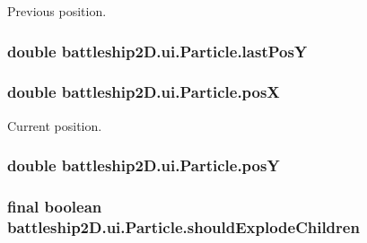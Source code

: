 Previous position. 

\hypertarget{classbattleship2D_1_1ui_1_1Particle_a5a420fd563faed7e5fe9635413dd6b5e}{
\subsubsection[{last\-Pos\-Y}]{\setlength{\rightskip}{0pt plus 5cm}double battleship2\-D.\-ui.\-Particle.\-last\-Pos\-Y\hspace{0.3cm}{\ttfamily [package]}}}\label{classbattleship2D_1_1ui_1_1Particle_a5a420fd563faed7e5fe9635413dd6b5e}
\hypertarget{classbattleship2D_1_1ui_1_1Particle_a43ea7800c7ba89fcc30583e2cc0970e4}{
\subsubsection[{pos\-X}]{\setlength{\rightskip}{0pt plus 5cm}double battleship2\-D.\-ui.\-Particle.\-pos\-X\hspace{0.3cm}{\ttfamily [private]}}}\label{classbattleship2D_1_1ui_1_1Particle_a43ea7800c7ba89fcc30583e2cc0970e4}


Current position. 

\hypertarget{classbattleship2D_1_1ui_1_1Particle_ad049d4283943c3eb9f3ed76dfdb585c2}{
\subsubsection[{pos\-Y}]{\setlength{\rightskip}{0pt plus 5cm}double battleship2\-D.\-ui.\-Particle.\-pos\-Y\hspace{0.3cm}{\ttfamily [package]}}}\label{classbattleship2D_1_1ui_1_1Particle_ad049d4283943c3eb9f3ed76dfdb585c2}
\hypertarget{classbattleship2D_1_1ui_1_1Particle_ae89e92c546d7ab12b38a1da0ed34470c}{
\subsubsection[{should\-Explode\-Children}]{\setlength{\rightskip}{0pt plus 5cm}final boolean battleship2\-D.\-ui.\-Particle.\-should\-Explode\-Children\hspace{0.3cm}{\ttfamily [private]}}}\label{classbattleship2D_1_1ui_1_1Particle_ae89e92c546d7ab12b38a1da0ed34470c}


